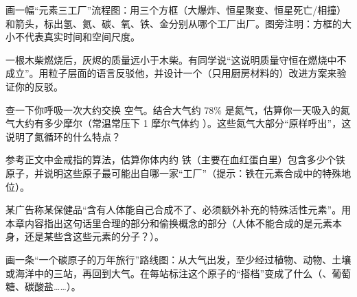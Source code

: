 \begin{sikaoti}
\item 画一幅“元素三工厂”流程图：用三个方框（大爆炸、恒星聚变、恒星死亡/相撞）和箭头，标出氢、氦、碳、氧、铁、金分别从哪个工厂出厂。图旁注明：方框的大小不代表真实时间和空间尺度。
\item 一根木柴燃烧后，灰烬的质量远小于木柴。有同学说“这说明质量守恒在燃烧中不成立”。用粒子层面的语言反驳他，并设计一个（只用厨房材料的）改进方案来验证你的反驳。
\item 查一下你呼吸一次大约交换  空气。结合大气约 78\% 是氮气，估算你一天吸入的氮气大约有多少摩尔（常温常压下 1 摩尔气体约 ）。这些氮气大部分“原样呼出”，这说明了氮循环的什么特点？
\item 参考正文中金戒指的算法，估算你体内约  铁（主要在血红蛋白里）包含多少个铁原子，并说明这些原子最可能出自哪一家“工厂”（提示：铁在元素合成中的特殊地位）。
\item 某广告称某保健品“含有人体能自己合成不了、必须额外补充的特殊活性元素”。用本章内容指出这句话里合理的部分和偷换概念的部分（人体不能合成的是元素本身，还是某些含这些元素的分子？）。
\item 画一条“一个碳原子的万年旅行”路线图：从大气出发，至少经过植物、动物、土壤或海洋中的三站，再回到大气。在每站标注这个原子的“搭档”变成了什么（、葡萄糖、碳酸盐……）。
\end{sikaoti}
